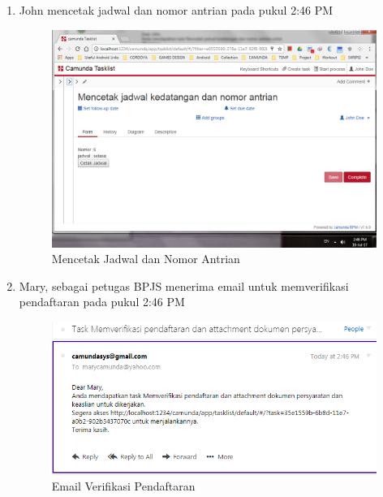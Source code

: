 \begin{enumerate}
	\item John mencetak jadwal dan nomor antrian pada pukul 2:46 PM
			\begin{figure}[H]
			\centering
			\includegraphics[scale=0.5]{Gambar/Bab-5/kasus2/11}
			\caption{Mencetak Jadwal dan Nomor Antrian} 
			\label{fig:pengujian_kasus2_11}
	\end{figure}
	

	\item Mary, sebagai petugas BPJS menerima email untuk memverifikasi pendaftaran pada pukul 2:46 PM
			\begin{figure}[H]
			\centering
			\includegraphics[scale=0.8]{Gambar/Bab-5/kasus2/12}
			\caption{Email Verifikasi Pendaftaran} 
			\label{fig:pengujian_kasus2_12}
	\end{figure}
	


\end{enumerate}

